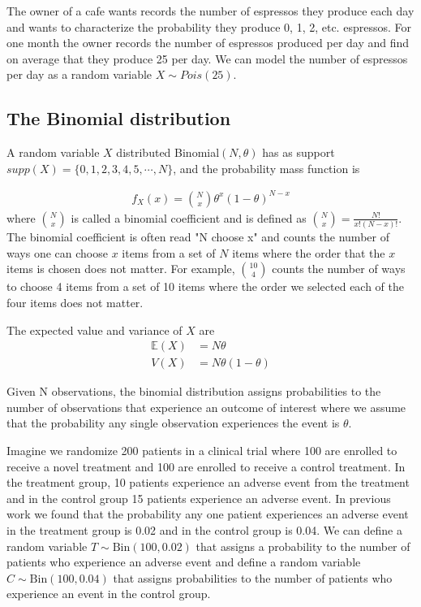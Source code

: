 \ex The owner of a cafe wants records the number of espressos they produce each day and wants to characterize the probability they produce 0, 1, 2, etc. espressos. For one month the owner records the number of espressos produced per day and find on average that they produce 25 per day. We can model the number of espressos per day as a random variable $X \sim Pois(25)$.

\subsection{The Binomial distribution }

A random variable $X$ distributed Binomial$(N,\theta)$ has as support $supp(X) = \{0,1,2,3,4,5,\cdots,N\}$, and the probability mass function is 

\begin{align}
    f_{X}(x) = \binom{N}{x} \theta^{x}(1-\theta)^{N-x}
\end{align}
where $\binom{N}{x}$ is called a binomial coefficient and is defined as $\binom{N}{x} = \frac{N!}{x!(N-x)!}$.
The binomial coefficient is often read "N choose x" and counts the number of ways one can choose $x$ items from a set of $N$ items where the order that the $x$ items is chosen does not matter. For example, $\binom{10}{4}$ counts the number of ways to choose 4 items from a set of 10 items where the order we selected each of the four items does not matter.

The expected value and variance of $X$ are 
\begin{align}
    \mathbb{E}(X) &= N\theta \\ 
             V(X) &= N\theta(1-\theta)
\end{align}

Given N observations, the binomial distribution assigns probabilities to the number of observations that experience an outcome of interest where we assume that the probability any single observation experiences the event is $\theta$. 

\ex Imagine we randomize 200 patients in a clinical trial where 100 are enrolled to receive a novel treatment and 100 are enrolled to receive a control treatment. In the treatment group, 10 patients experience an adverse event from the treatment and in the control group 15 patients experience an adverse event. In previous work we found that the probability any one patient experiences an adverse event in the treatment group is 0.02 and in the control group is 0.04. We can define a random variable $T \sim \text{Bin}(100,0.02)$ that assigns a probability to the number of patients who experience an adverse event and define a random variable $C \sim \text{Bin}(100,0.04)$ that assigns probabilities to the number of patients who experience an event in the control group.     

